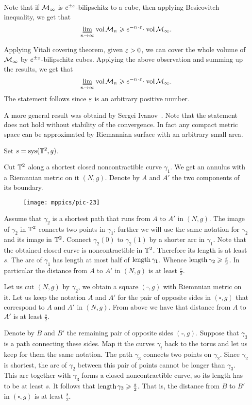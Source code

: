Note that if $\mathcal{M}_\infty$ is $e^{\pm\varepsilon}$-bilipschitz to a cube, then applying Besicovitch inequality, we get that 
\[\liminf_{n\to\infty} \vol \spc{M}_n\ge e^{-n\cdot \eps}\cdot\vol \spc{M}_\infty.\]

Applying Vitali covering theorem, given $\varepsilon>0$, we can cover the whole volume of $\mathcal{M}_\infty$ by $e^{\pm\varepsilon}$-bilipschitz cubes.
Applying the above observation and summing up the results, we get that 
\[\liminf_{n\to\infty} \vol \spc{M}_n\ge e^{-n\cdot \eps}\cdot\vol \spc{M}_\infty.\]
The statement follows since $\varepsilon$ is an arbitrary positive number.

 A more general result was obtaind by Sergei Ivanov~\cite{ivanov-1997}.
Note that the statement does not hold without stability of the convergence. In fact any compact metric space can be approximated by Riemannian surface with an arbitrary small area.

Set $s=\mathop{\rm sys}\nolimits(\mathbb{T}^2,g)$.

Cut $\mathbb{T}^2$ along a shortest closed noncontractible curve $\gamma_1$.
We get an annulus with a Riemnnian metric on it $(N,g)$.
Denote by $A$ and $A'$ the two components of its boundary.

\begin{wrapfigure}{o}{45 mm}
\vskip2mm
\centering
\texttt{[image: mppics/pic-23]}
\end{wrapfigure}

Assume that $\gamma_2$ is a shortest path that runs from $A$ to $A'$ in $(N,g)$.
The image of $\gamma_2$ in $\mathbb{T}^2$ connects two points in $\gamma_1$;
further we will use the same notation for $\gamma_2$ and its image in $\mathbb{T}^2$.
Connect $\gamma_2(0)$ to $\gamma_2(1)$ by a shorter arc in $\gamma_1$.
Note that the obtained closed curve is noncontractible in $\mathbb{T}^2$.
Therefore its length is at least $s$.
The arc of $\gamma_1$ has length at most half of $\mathop{\rm length}\nolimits\gamma_1$.
Whence $\mathop{\rm length}\nolimits \gamma_2\geqslant \tfrac s2$.
In particular the distance from $A$ to $A'$ in $(N,g)$ is at least $\tfrac s2$.

Let us cut $(N,g)$ by $\gamma_2$, we obtain a square $(\square,g)$ with Riemnnian metric on it.
Let us keep the notation $A$ and $A'$ for the pair of opposite sides in $(\square,g)$ that correspond to $A$ and $A'$ in $(N,g)$.
From above we have that distance from $A$ to $A'$ is at least $\tfrac s2$.

Denote by $B$ and $B'$ the remaining pair of opposite sides $(\square,g)$.
Suppose that $\gamma_3$ is a path connecting these sides.
Map it the curves $\gamma_i$ back to the torus and let us keep for them the same notation.
The path $\gamma_3$ connects two points on $\gamma_2$.
Since $\gamma_2$ is shortest, the arc of $\gamma_2$ between this pair of points cannot be longer than $\gamma_3$.
This arc together with $\gamma_3$ forms a closed noncontractible curve, so its length has to be at least $s$.
It follows that $\mathop{\rm length}\nolimits\gamma_3\geqslant \tfrac s2$.
That is, the distance from $B$ to $B'$ in  $(\square,g)$ is at least $\tfrac s2$.

